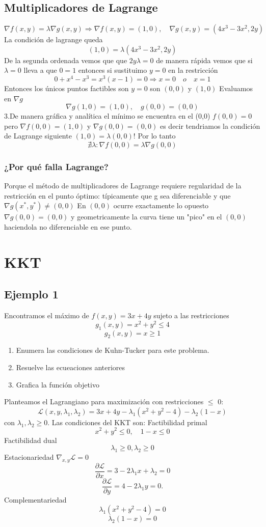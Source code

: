 \documentclass[11pt,a4paper]{article}
\begin{document}
\subsection{Multiplicadores de Lagrange}
\[
\nabla f(x,y) = \lambda \nabla g(x,y) \Rightarrow \nabla f(x,y) = (1,0), \quad \nabla g(x,y) = (4x^3 - 3x^2, 2y)
\]
La condición de lagrange queda 
\[
(1,0) = \lambda (4x^3 - 3x^2, 2y)
\]
De la segunda ordenada vemos que que $2y\lambda = 0$ de manera rápida vemos que si $\lambda = 0$ lleva a que $0=1$ entonces si sustituimo $y=0$ en la restricción 
\[
0 + x^4 - x^3 = x^3(x-1) =0 \Rightarrow x=0 \quad o \quad x = 1
\]
Entonces los únicos puntos factibles son $y=0$ son $(0,0)$ y $(1,0)$
Evaluamos en $\nabla g$ 
\[
\nabla g(1,0) =(1,0), \quad g(0,0) = (0,0)
\]
3.De manera gráfica y analítica el mínimo se encuentra en el (0,0) $f(0,0) = 0$
pero $\nabla f(0,0) = (1,0)$ y $\nabla g(0,0) = (0,0)$ es decir tendriamos la condición de Lagrange siguiente
$(1,0) = \lambda(0,0) !$ Por lo tanto
\[
\nexists \lambda : \nabla f(0,0) = \lambda \nabla g(0,0)
\]
\subsubsection{¿Por qué falla Lagrange?}
Porque el método de multiplicadores de Lagrange requiere regularidad de la restricción en el punto óptimo: típicamente que 
g sea diferenciable y que $\nabla g(x^*, y^*) \neq (0,0)$
En $(0,0)$ ocurre exactamente lo opuesto $\nabla g(0,0) = (0,0)$ y geometricamente la curva tiene un "pico" en el $(0,0)$
haciendola no diferenciable en ese punto.

\section{KKT}
\subsection{Ejemplo 1}
Encontramos el máximo de $f(x,y) = 3x + 4y$ sujeto a las restricciones \[g_1(x,y) = x^2 + y^2 \leq 4\]
\[ g_2(x,y) = x \geq 1 \]
\begin{enumerate}
\item Enumera las condiciones de Kuhn-Tucker para este problema.
\item Resuelve las ecueaciones anteriores
\item Grafica la función objetivo
\end{enumerate}
Planteamos el Lagrangiano para maximización con restricciones $\leq$ 0:
\[
\mathcal{L}(x,y,\lambda_1, \lambda_2) = 3x + 4y - \lambda_1(x^2 + y^2 - 4)-\lambda_2 (1-x) 
\] con $\lambda_1, \lambda_2 \geq 0$.
Las condiciones del KKT son:
\newline
Factibilidad primal
\[x^2 + y^2 \leq 0, \quad 1-x\leq 0\]
Factibilidad dual
\[\lambda_1 \geq 0, \lambda_2\geq 0 \]
Estacionariedad $\nabla_{x,y} \mathcal{L} = 0$
\[\frac{\partial \mathcal{L}}{\partial x} = 3-2\lambda_1x+\lambda_2 = 0\]
\[\frac{\partial \mathcal{L}}{\partial y} = 4 -2\lambda_1y = 0.\]
Complementariedad
\[\lambda_1(x^2+y^2 -4)=0\]
\[\lambda_2(1-x)=0\]
\end{document}
